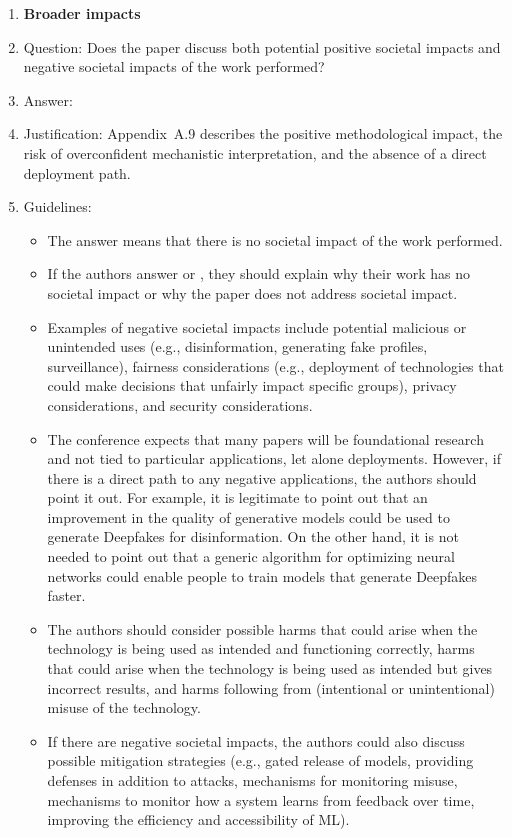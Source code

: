 \documentclass[
]{article}
\begin{document}
\begin{enumerate}
\item {\bf Broader impacts}
    \item[] Question: Does the paper discuss both potential positive societal impacts and negative societal impacts of the work performed?
    \item[] Answer: \answerYes{} %
    \item[] Justification: Appendix~A.9 describes the positive methodological impact, the risk of overconfident mechanistic interpretation, and the absence of a direct deployment path.
    \item[] Guidelines:
    \begin{itemize}
        \item The answer \answerNA{} means that there is no societal impact of the work performed.
        \item If the authors answer \answerNA{} or \answerNo, they should explain why their work has no societal impact or why the paper does not address societal impact.
        \item Examples of negative societal impacts include potential malicious or unintended uses (e.g., disinformation, generating fake profiles, surveillance), fairness considerations (e.g., deployment of technologies that could make decisions that unfairly impact specific groups), privacy considerations, and security considerations.
        \item The conference expects that many papers will be foundational research and not tied to particular applications, let alone deployments. However, if there is a direct path to any negative applications, the authors should point it out. For example, it is legitimate to point out that an improvement in the quality of generative models could be used to generate Deepfakes for disinformation. On the other hand, it is not needed to point out that a generic algorithm for optimizing neural networks could enable people to train models that generate Deepfakes faster.
        \item The authors should consider possible harms that could arise when the technology is being used as intended and functioning correctly, harms that could arise when the technology is being used as intended but gives incorrect results, and harms following from (intentional or unintentional) misuse of the technology.
        \item If there are negative societal impacts, the authors could also discuss possible mitigation strategies (e.g., gated release of models, providing defenses in addition to attacks, mechanisms for monitoring misuse, mechanisms to monitor how a system learns from feedback over time, improving the efficiency and accessibility of ML).
    \end{itemize}
    

\end{enumerate}
\end{document}

